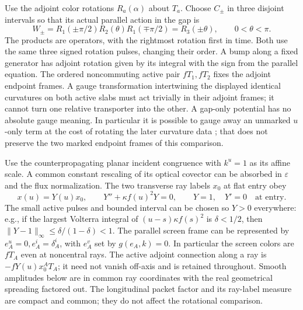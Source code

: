 \documentclass[11pt]{article}
\newcommand{\eps}{\varepsilon}
\begin{document}
Use the adjoint color rotations \(R_a(\alpha)\) about
\(T_a\). Choose \(C_\pm\) in three disjoint intervals so
that its actual parallel action in the gap is
\begin{equation}\label{eq:word}
 W_\pm=
   R_1(\pm\pi/2)R_2(\theta)R_1(\mp\pi/2)=R_3(\pm\theta),
      \qquad 0<\theta<\pi .
\end{equation}
The products are operators, with the rightmost rotation
first in time. Both use the same three signed rotation
pulses, changing their order. A bump along a fixed generator
has adjoint rotation given by its integral with the sign
from the parallel equation. The ordered noncommuting active
pair \(fT_1,fT_2\) fixes the adjoint endpoint frames.
A gauge transformation intertwining the displayed identical
curvatures on both active slabs must act trivially in their
adjoint frames; it cannot turn one relative transporter into
the other. A gap-only potential has no absolute gauge
meaning. In particular it is possible to gauge away an
unmarked \(u\)-only term at the cost of rotating the later
curvature data \cite[Secs.~II and IV]{gst}; that does not
preserve the two marked endpoint frames of this comparison.

Use the counterpropagating planar incident congruence with
\(k^u=1\) as its affine scale. A common constant
rescaling of its optical covector can be absorbed in
\(\eps\) and the flux normalization. The two transverse
ray labels \(x_0\) at flat entry obey
\[
 x(u)=Y(u)x_0,\qquad Y''+\kappa f(u)^2Y=0,\qquad
 Y=1,\quad Y'=0\quad\text{at entry}.
\]
The small active pulses and bounded interval can be chosen
so \(Y>0\) everywhere: e.g., if the largest Volterra
integral of \((u-s)\kappa f(s)^2\) is \(\delta<1/2\),
then \(\|Y-1\|_\infty\le\delta/(1-\delta)<1\).
The parallel screen frame can be represented by
\(e_A^u=0,e_A^i=\delta_A^i\), with \(e_A^v\) set by
\(g(e_A,k)=0\). In particular the screen colors are \(fT_A\)
even at noncentral rays. The active adjoint connection
along a ray is \(-fY(u)x_0^AT_A\); it need not vanish
off-axis and is retained throughout. Smooth amplitudes
below are in common ray coordinates with the real
geometrical spreading factored out. The longitudinal
packet factor and its ray-label measure are compact and
common; they do not affect the rotational comparison.
\end{document}
